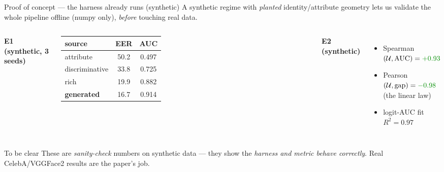 \documentclass[aspectratio=169,10pt]{beamer}
\newcommand{\U}{\mathcal{U}}
\newcommand{\good}[1]{\textcolor{green!55!black}{#1}}
\newcommand{\bad}[1]{\textcolor{red!70!black}{#1}}
\begin{document}
\begin{frame}{Proof of concept --- the harness already runs (synthetic)}
  \small
  A synthetic regime with \emph{planted} identity/attribute geometry lets us validate the
  whole pipeline offline (numpy only), \emph{before} touching real data.
  \vspace{0.4em}
  \begin{columns}[T]
      \centering\footnotesize
      \textbf{E1 (synthetic, 3 seeds)}\\[0.2em]
      \begin{tabular}{@{}lcc@{}}
        \toprule
        source & EER & AUC \\
        \midrule
        attribute      & \bad{50.2} & \bad{0.497} \\
        discriminative & 33.8 & 0.725 \\
        rich           & 19.9 & 0.882 \\
        \textbf{generated} & \good{16.7} & \good{0.914} \\
        \bottomrule
      \end{tabular}
      \textbf{E2 (synthetic)}
      \begin{itemize}\footnotesize
        \item Spearman$(\U,\text{AUC}) = \good{+0.93}$
        \item Pearson$(\U,\text{gap}) = \good{-0.98}$ \\ (the linear law)
        \item logit-AUC fit $R^2 = 0.97$
      \end{itemize}
  \end{columns}
  \vspace{0.5em}
  \begin{alertblock}{\footnotesize To be clear}
    \footnotesize These are \emph{sanity-check} numbers on synthetic data --- they show the
    \emph{harness and metric behave correctly}. Real CelebA/VGGFace2 results are the paper's job.
  \end{alertblock}
\end{frame}
\end{document}
